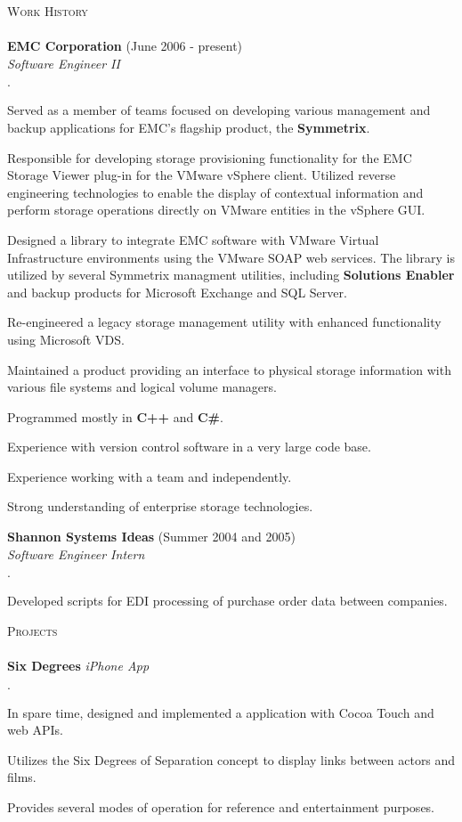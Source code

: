 \documentclass{article}
\newcommand{\mydot}{$\cdot$}
\newcommand{\lineunder}{\vspace*{-8pt} \\ \hspace*{-18pt} \hrulefill \\}
\newcommand{\header}[1]{{\hspace*{-15pt}\vspace*{6pt} \textsc{#1}} \vspace*{-6pt} \lineunder}
\newcommand{\employer}[3]{ \textbf{#1} (#2)\\ \emph{#3}\\  }
\newcommand{\project}[2]{ \textbf{#1} \emph{#2}\\  }
\newenvironment{achievements}{\begin{list}{\mydot}{\topsep 0pt \itemsep -2pt}}{\vspace*{4pt}\end{list}}
\begin{document}
\header{Work History}
\employer{EMC Corporation}{June 2006 - present}{Software Engineer II}
\begin{achievements}
  \item Served as a member of teams focused on developing various management and backup applications for EMC's flagship product, the \textbf{Symmetrix}.
  \item Responsible for developing storage provisioning functionality for the EMC Storage Viewer plug-in for the VMware vSphere client.  Utilized reverse engineering technologies to enable the display of contextual information and perform storage operations directly on VMware entities in the vSphere GUI.
  \item Designed a library to integrate EMC software with VMware Virtual Infrastructure environments using the VMware SOAP web services.  The library is utilized by several Symmetrix managment utilities, including \textbf{Solutions Enabler} and backup products for Microsoft Exchange and SQL Server.
  \item Re-engineered a legacy storage management utility with enhanced functionality using Microsoft VDS.
  \item Maintained a product providing an interface to physical storage information with various file systems and logical volume managers.
  \item Programmed mostly in \textbf{C++} and \textbf{C\#}.
  \item Experience with version control software in a very large code base.
  \item Experience working with a team and independently.
  \item Strong understanding of enterprise storage technologies.
\end{achievements}

\employer{Shannon Systems Ideas}{Summer 2004 and 2005}{Software Engineer Intern}
\begin{achievements}
  \item Developed scripts for EDI processing of purchase order data between companies.
\end{achievements}


\header{Projects}
\project{Six Degrees}{iPhone App}{
\begin{achievements}
  \item In spare time, designed and implemented a application with Cocoa Touch and web APIs.
  \item Utilizes the Six Degrees of Separation concept to display links between actors and films.
  \item Provides several modes of operation for reference and entertainment purposes.
\end{achievements}}
\end{document}
